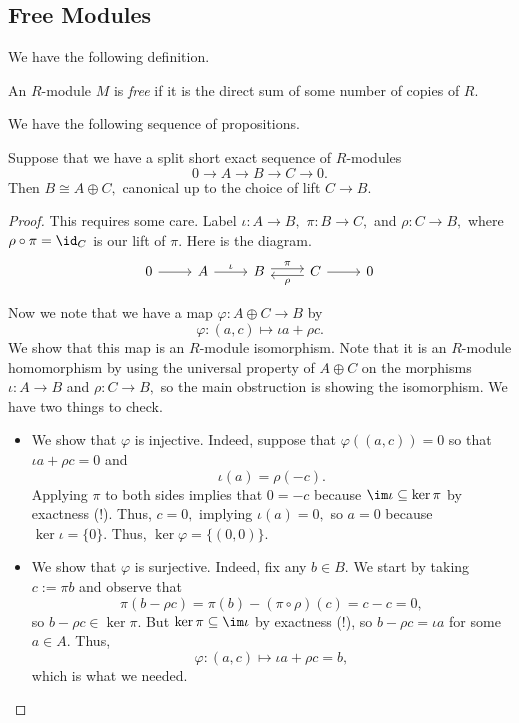 \subsection{Free Modules}
We have the following definition.
\begin{defi}[Free]
	An $R$-module $M$ is \textit{free} if it is the direct sum of some number of copies of $R.$
\end{defi}
We have the following sequence of propositions.
\begin{proposition}
	Suppose that we have a split short exact sequence of $R$-modules
	\[0\to A\to B\to C\to 0.\]
	Then $B\cong A\oplus C,$ canonical up to the choice of lift $C\to B.$
\end{proposition}
\begin{proof}
	This requires some care. Label $\iota:A\to B,$ $\pi:B\to C,$ and $\rho:C\to B,$ where $\rho\circ\pi=\id_C$ is our lift of $\pi.$ Here is the diagram.
	\[\begin{tikzcd}
		0 & A & B & C & 0
		\arrow[from=1-1, to=1-2]
		\arrow["\iota", from=1-2, to=1-3]
		\arrow["\pi", shift left=1, from=1-3, to=1-4]
		\arrow[from=1-4, to=1-5]
		\arrow["\rho", shift left=1, from=1-4, to=1-3]
	\end{tikzcd}\]

	Now we note that we have a map $\varphi:A\oplus C\to B$ by
	\[\varphi:(a,c)\mapsto\iota a+\rho c.\]
	We show that this map is an $R$-module isomorphism. Note that it is an $R$-module homomorphism by using the universal property of $A\oplus C$ on the morphisms $\iota:A\to B$ and $\rho:C\to B,$ so the main obstruction is showing the isomorphism. We have two things to check.
	\begin{itemize}
		\item We show that $\varphi$ is injective. Indeed, suppose that $\varphi((a,c))=0$ so that $\iota a+\rho c=0$ and
		\[\iota(a)=\rho(-c).\]
		Applying $\pi$ to both sides implies that $0=-c$ because $\im\iota\subseteq\ker\pi$ by exactness (!). Thus, $c=0,$ implying $\iota(a)=0,$ so $a=0$ because $\ker\iota=\{0\}.$ Thus, $\ker\varphi=\{(0,0)\}.$
		\item We show that $\varphi$ is surjective. Indeed, fix any $b\in B.$ We start by taking $c:=\pi b$ and observe that
		\[\pi(b-\rho c)=\pi(b)-(\pi\circ\rho)(c)=c-c=0,\]
		so $b-\rho c\in\ker\pi.$ But $\ker\pi\subseteq\im\iota$ by exactness (!), so $b-\rho c=\iota a$ for some $a\in A.$ Thus,
		\[\varphi:(a,c)\mapsto\iota a+\rho c=b,\]
		which is what we needed.
		\qedhere
	\end{itemize}
\end{proof}
